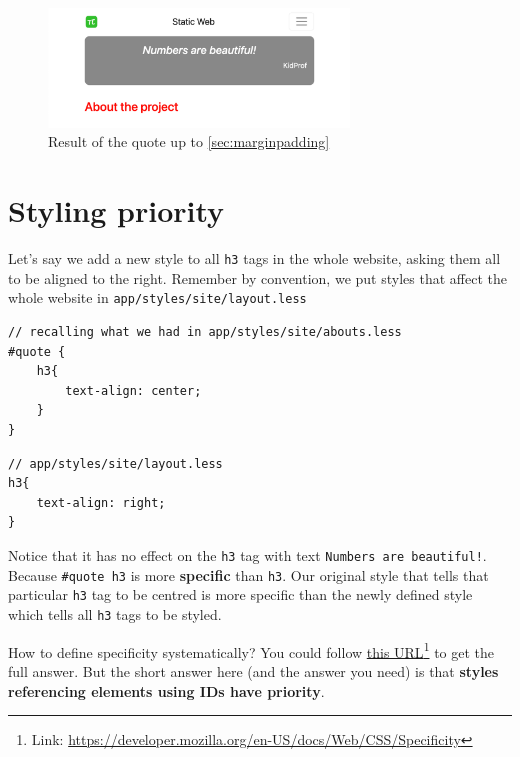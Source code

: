\begin{figure}[H]
\centering
\includegraphics[width=8cm]{images/chn6-quote.png}
\caption{Result of the quote up to \cref{sec:marginpadding}}
\end{figure}


\section{Styling priority}
\label{sec:stylingpriority}

Let's say we add a new style to all \texttt{h3} tags in the whole website, asking them all to be aligned to the right. Remember by convention, we put styles that affect the whole website in \texttt{app/styles/site/layout.less}

\begin{lstlisting}[language=pug]
// recalling what we had in app/styles/site/abouts.less
#quote {
    h3{
        text-align: center;
    }
}
\end{lstlisting}

\begin{lstlisting}[language=pug]
// app/styles/site/layout.less
h3{
    text-align: right;
}
\end{lstlisting}

Notice that it has no effect on the \texttt{h3} tag with text \texttt{Numbers are beautiful!}. Because \texttt{\#quote h3} is more \textbf{specific} than \texttt{h3}. Our original style that tells that particular \texttt{h3} tag to be centred is more specific than the newly defined style which tells all \texttt{h3} tags to be styled. 

How to define specificity systematically? You could follow \href{https://developer.mozilla.org/en-US/docs/Web/CSS/Specificity}{this URL}\footnote{Link: \url{https://developer.mozilla.org/en-US/docs/Web/CSS/Specificity}} to get the full answer. But the short answer here (and the answer you need) is that \textbf{styles referencing elements using IDs have priority}.

